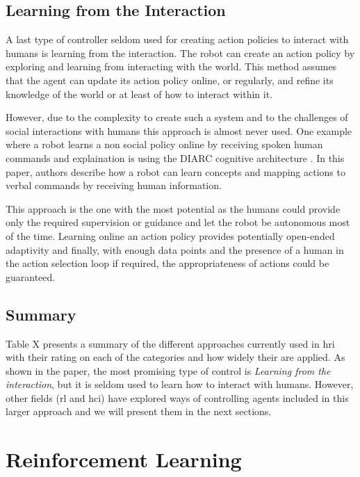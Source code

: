 \subsection{Learning from the Interaction}

	A last type of controller seldom used for creating action policies to interact with humans is learning from the interaction. The robot can create an action policy by exploring and learning from interacting with the world. This method assumes that the agent can update its action policy online, or regularly, and refine its knowledge of the world or at least of how to interact within it. 
	
	However, due to the complexity to create such a system and to the challenges of social interactions with humans this approach is almost never used. One example where a robot learns a non social policy online by receiving spoken human commands and explaination is using the DIARC cognitive architecture \citep{scheutz2017spoken}. In this paper, authors describe how a robot can learn concepts and mapping actions to verbal commands by receiving human information.

	This approach is the one with the most potential as the humans could provide only the required supervision or guidance and let the robot be autonomous most of the time. Learning online an action policy provides potentially open-ended adaptivity and finally, with enough data points and the presence of a human in the action selection loop if required, the appropriateness of actions could be guaranteed.

	
\subsection{Summary}

	Table X presents a summary of the different approaches currently used in \gls{hri} with their rating on each of the categories and how widely their are applied. As shown in the paper, the most promising type of control is \textit{Learning from the interaction}, but it is seldom used to learn how to interact with humans. However, other fields (\acrlong{rl} and \gls{hci}) have explored ways of controlling agents included in this larger approach and we will present them in the next sections.

\section{Reinforcement Learning} 	
